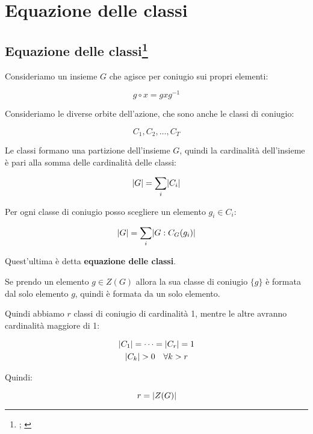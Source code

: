 \chapter{Equazione delle classi}

\section[Equazione delle classi]{Equazione delle classi\footnote{\cite[8 novembre 2021]{lucchini}; \cite[Week 2, 5]{lucchini_week}}}

Consideriamo un insieme $G$ che agisce per coniugio sui propri elementi:

\begin{equation}
	g \circ x = gxg^{-1}
\end{equation}

Consideriamo le diverse orbite dell'azione, che sono anche le classi di coniugio:

\begin{equation}
	C_1, C_2, \dots, C_T
\end{equation}

Le classi formano una partizione dell'insieme $G$, quindi la cardinalità dell'insieme è pari alla somma delle cardinalità delle classi:

\begin{equation}
	\lvert G \rvert = \sum_i \lvert C_i \rvert
\end{equation}

Per ogni classe di coniugio posso scegliere un elemento $g_i \in C_i$:

\begin{equation}
	\lvert G \rvert = \sum_i \lvert G:C_G(g_i) \rvert
\end{equation}

Quest'ultima è detta \textbf{equazione delle classi}.

	Se prendo un elemento $g \in Z(G)$ allora la sua classe di coniugio $\{g\}$ è formata dal solo elemento $g$, quindi è formata da un solo elemento.

Quindi abbiamo $r$ classi di coniugio di cardinalità 1, mentre le altre avranno cardinalità maggiore di 1:

\begin{gather}
	\lvert C_1 \rvert = \dots = \lvert C_r \rvert = 1 \\
	\lvert C_k \rvert > 0 \quad \forall k > r
\end{gather}

Quindi:

\begin{equation}
	r = \lvert Z(G) \rvert
\end{equation}

